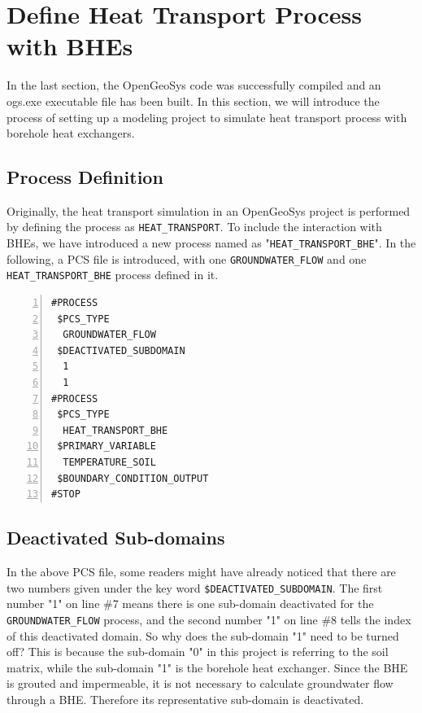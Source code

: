 \section{Define Heat Transport Process with BHEs}

In the last section, the OpenGeoSys code was successfully compiled and an ogs.exe executable file has been built. In this section, we will introduce the process of setting up a modeling project to simulate heat transport process with borehole heat exchangers.  

\subsection{Process Definition}

Originally, the heat transport simulation in an OpenGeoSys project is performed by defining the process as \texttt{HEAT\_TRANSPORT}. To include the interaction with BHEs, we have introduced a new process named as "\texttt{HEAT\_TRANSPORT\_BHE}". In the following, a PCS file is introduced, with one \texttt{GROUNDWATER\_FLOW} and one \texttt{HEAT\_TRANSPORT\_BHE} process defined in it. 

\begin{Verbatim}[gobble=0, 
                 frame=single, 
                 label=PCS File Definition including Interaction with Borehole Heat Exchangers, 
                 numbers=left]
#PROCESS
 $PCS_TYPE
  GROUNDWATER_FLOW
 $DEACTIVATED_SUBDOMAIN
  1
  1 
#PROCESS
 $PCS_TYPE
  HEAT_TRANSPORT_BHE
 $PRIMARY_VARIABLE
  TEMPERATURE_SOIL
 $BOUNDARY_CONDITION_OUTPUT
#STOP
\end{Verbatim}

\subsection{Deactivated Sub-domains}
In the above PCS file, some readers might have already noticed that there are two numbers given under the key word \texttt{\$DEACTIVATED\_SUBDOMAIN}. The first number "1" on line \#7 means there is one sub-domain deactivated for the \texttt{GROUNDWATER\_FLOW} process, and the second number "1" on line \#8 tells the index of this deactivated domain. So why does the sub-domain "1" need to be turned off? This is because the sub-domain "0" in this project is referring to the soil matrix, while the sub-domain "1" is the borehole heat exchanger. Since the BHE is grouted and impermeable, it is not necessary to calculate groundwater flow through a BHE. Therefore its representative sub-domain is deactivated. 

